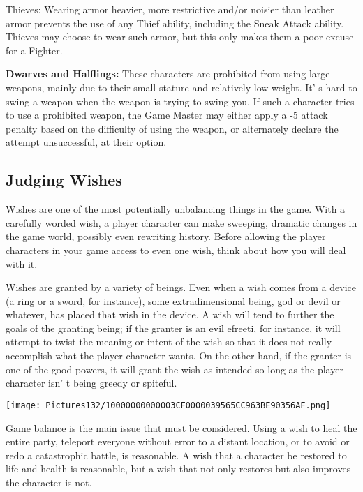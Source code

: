 \documentclass[a4paper,twoside,openany,10pt]{book}
\begin{document}
\begin{multicols}{2}
Thieves: Wearing armor heavier, more restrictive and/or noisier than leather armor prevents the use of any Thief ability, including the Sneak Attack ability. Thieves may choose to wear such armor, but this only makes them a poor excuse for a Fighter.

\textbf{Dwarves and Halflings:} These characters are prohibited from using large weapons, mainly due to their small stature and relatively low weight. It' s hard to swing a weapon when the weapon is trying to swing you. If such a character tries to use a prohibited weapon, the Game Master may either apply a -5 attack penalty based on the difficulty of using the weapon, or alternately declare the attempt unsuccessful, at their option.

\subsection{Judging Wishes}\label{judging-wishes}

Wishes are one of the most potentially unbalancing things in the game.  With a carefully worded wish, a player character can make sweeping, dramatic changes in the game world, possibly even rewriting history. Before allowing the player characters in your game access to even one wish, think about how you will deal with it.

Wishes are granted by a variety of beings. Even when a wish comes from a device (a ring or a sword, for instance), some extradimensional being, god or devil or whatever, has placed that wish in the device. A wish will tend to further the goals of the granting being; if the granter is an evil efreeti, for instance, it will attempt to twist the meaning or intent of the wish so that it does not really accomplish what the player character wants. On the other hand, if the granter is one of the good powers, it will grant the wish as intended so long as the player character isn' t being greedy or spiteful.

\begin{flushleft} \texttt{[image: Pictures132/10000000000003CF0000039565CC963BE90356AF.png]}  \end{flushleft}

Game balance is the main issue that must be considered. Using a wish to heal the entire party, teleport everyone without error to a distant location, or to avoid or redo a catastrophic battle, is reasonable. A wish that a character be restored to life and health is reasonable, but a wish that not only restores but also improves the character is not.


\end{multicols}
\end{document}
